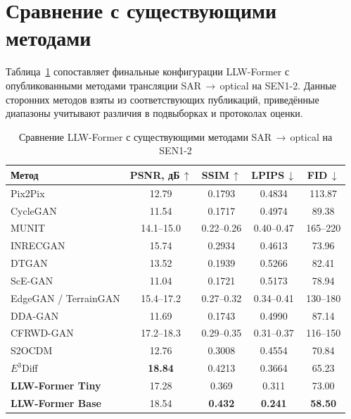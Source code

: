 \section{Сравнение с существующими методами}
\label{sec:results:sota}

Таблица~\ref{tab:sota} сопоставляет финальные конфигурации LLW-Former с
опубликованными методами трансляции SAR\,$\to$\,optical на SEN1-2. Данные сторонних
методов взяты из соответствующих публикаций, приведённые диапазоны учитывают различия
в подвыборках и протоколах оценки.

\begin{table}[H]
  \caption{Сравнение LLW-Former с существующими методами SAR\,$\to$\,optical на SEN1-2}
  \label{tab:sota}
  \centering
  \small
  \begin{tabular}{lcccc}
    \toprule
    Метод & PSNR, дБ\,$\uparrow$ & SSIM\,$\uparrow$ & LPIPS\,$\downarrow$ & FID\,$\downarrow$ \\
    \midrule
    Pix2Pix                   & 12.79 & 0.1793 & 0.4834 & 113.87 \\
    CycleGAN                 & 11.54 & 0.1717 & 0.4974 & 89.38  \\
    MUNIT                     & 14.1--15.0 & 0.22--0.26 & 0.40--0.47 & 165--220 \\
    INRECGAN                & 15.74 & 0.2934 & 0.4613 & 73.96  \\
    DTGAN                        & 13.52 & 0.1939 & 0.5266 & 82.41  \\
    ScE-GAN                     & 11.04 & 0.1721 & 0.5173 & 78.94  \\
    EdgeGAN / TerrainGAN  & 15.4--17.2 & 0.27--0.32 & 0.34--0.41 & 130--180 \\
    DDA-GAN                    & 11.69 & 0.1743 & 0.4990 & 87.14  \\
    CFRWD-GAN                    & 17.2--18.3 & 0.29--0.35 & 0.31--0.37 & 116--150 \\
    \midrule
    S2OCDM                 & 12.76 & 0.3008 & 0.4554 & 70.84  \\
    $E^3$Diff                   & \textbf{18.84} & 0.4213 & 0.3664 & 65.23 \\
    \midrule
    \textbf{LLW-Former Tiny} & 17.28 & 0.369 & 0.311 & 73.00 \\
    \textbf{LLW-Former Base} & 18.54 & \textbf{0.432} & \textbf{0.241} & \textbf{58.50} \\
    \bottomrule
  \end{tabular}
\end{table}

